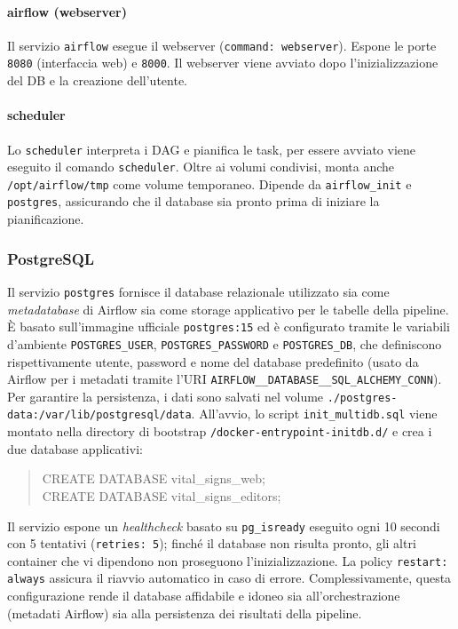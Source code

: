 \paragraph{airflow (webserver)}
Il servizio \texttt{airflow} esegue il webserver (\texttt{command: webserver}).
Espone le porte \texttt{8080} (interfaccia web) e \texttt{8000}. Il webserver viene avviato dopo l’inizializzazione del DB e la creazione dell’utente.

\paragraph{scheduler}
Lo \texttt{scheduler} interpreta i DAG e pianifica le task, per essere avviato viene eseguito il comando \texttt{scheduler}.
Oltre ai volumi condivisi, monta anche \texttt{/opt/airflow/tmp} come volume temporaneo.  
Dipende da \texttt{airflow\_init} e \texttt{postgres}, assicurando che il database sia pronto prima di iniziare la pianificazione.

\subsubsection{PostgreSQL}
Il servizio \texttt{postgres} fornisce il database relazionale utilizzato sia come \emph{metadatabase} di Airflow sia come storage applicativo per le tabelle della pipeline. È basato sull’immagine ufficiale \texttt{postgres:15} ed è configurato tramite le variabili d’ambiente \texttt{POSTGRES\_USER}, \texttt{POSTGRES\_PASSWORD} e \texttt{POSTGRES\_DB}, che definiscono rispettivamente utente, password e nome del database predefinito (usato da Airflow per i metadati tramite l’URI \texttt{AIRFLOW\_\_DATABASE\_\_SQL\_ALCHEMY\_CONN}).\\
Per garantire la persistenza, i dati sono salvati nel volume \texttt{./postgres-data:/var/lib/postgresql/data}. All’avvio, lo script \texttt{init\_multidb.sql} viene montato nella directory di bootstrap \texttt{/docker-entrypoint-initdb.d/} e crea i due database applicativi:
\begin{quote}\ttfamily
    \phantom{xxxx}CREATE DATABASE vital\_signs\_web; \\
    \phantom{xxxx}CREATE DATABASE vital\_signs\_editors;
\end{quote}

Il servizio espone un \emph{healthcheck} basato su \texttt{pg\_isready} eseguito ogni 10 secondi con 5 tentativi (\texttt{retries: 5}); finché il database non risulta pronto, gli altri container che vi dipendono non proseguono l’inizializzazione. La policy \texttt{restart: always} assicura il riavvio automatico in caso di errore. Complessivamente, questa configurazione rende il database affidabile e idoneo sia all’orchestrazione (metadati Airflow) sia alla persistenza dei risultati della pipeline.

